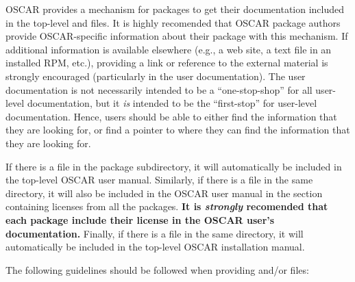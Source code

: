OSCAR provides a mechanism for packages to get their documentation
included in the top-level  and 
files.  It is highly recomended that OSCAR package authors provide
OSCAR-specific information about their package with this mechanism.
If additional information is available elsewhere (e.g., a web site, a
text file in an installed RPM, etc.), providing a link or reference to
the external material is strongly encouraged (particularly in the user
documentation).  The user documentation is not necessarily intended to
be a ``one-stop-shop'' for all user-level documentation, but it {\em
  is} intended to be the ``first-stop'' for user-level documentation.
Hence, users should be able to either find the information that they
are looking for, or find a pointer to where they can find the
information that they are looking for.

If there is a file  in the  package
subdirectory, it will automatically be included in the top-level OSCAR
user manual.  
%
Similarly, if there is a file  in the same
directory, it will also be included in the OSCAR user manual in the
section containing licenses from all the packages.  {\bf It is {\em
    strongly} recomended that each package include their license in
  the OSCAR user's documentation.}
%
Finally, if there is a file  in the same directory,
it will automatically be included in the top-level OSCAR installation
manual.  

The following guidelines should be followed when providing
 and/or  files:

